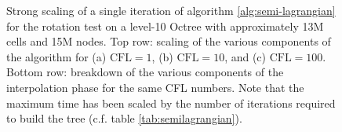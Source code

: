\begin{figure}[htbp]
\begin{center}
	\end{center}
	\caption{Strong scaling of a single iteration of algorithm \ref{alg:semi-lagrangian} for the rotation test on a level-10 Octree with approximately 13M cells and 15M nodes. Top row: scaling of the various components of the algorithm for (a) $\text{CFL} = 1$, (b) $\text{CFL} = 10$, and (c) $\text{CFL} = 100$. Bottom row: breakdown of the various components of the interpolation phase for the same CFL numbers. Note that the maximum time has been scaled by the number of iterations required to build the tree (c.f. table \ref{tab:semilagrangian}).}
	\label{fig:semilagrangian_small}
\end{figure}

